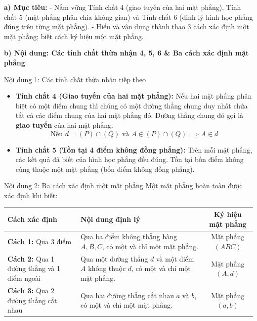\documentclass[12pt, a4paper]{article}
\begin{document}
\noindent \textbf{a) Mục tiêu:}
- Nắm vững Tính chất 4 (giao tuyến của hai mặt phẳng), Tính chất 5 (mặt phẳng phân chia không gian) và Tính chất 6 (định lý hình học phẳng đúng trên từng mặt phẳng).
- Hiểu và vận dụng thành thạo 3 cách xác định một mặt phẳng; biết cách ký hiệu một mặt phẳng.

\noindent \textbf{b) Nội dung: Các tính chất thừa nhận 4, 5, 6 \& Ba cách xác định mặt phẳng}
\begin{pedabox}{Nội dung 1: Các tính chất thừa nhận tiếp theo}
\begin{itemize}[leftmargin=0.6cm]
    \item \textbf{Tính chất 4 (Giao tuyến của hai mặt phẳng):} Nếu hai mặt phẳng phân biệt có một điểm chung thì chúng có một đường thẳng chung duy nhất chứa tất cả các điểm chung của hai mặt phẳng đó. Đường thẳng chung đó gọi là \textbf{giao tuyến} của hai mặt phẳng.
    $$\text{Nếu } d = (P) \cap (Q) \text{ và } A \in (P) \cap (Q) \implies A \in d$$
    \item \textbf{Tính chất 5 (Tồn tại 4 điểm không đồng phẳng):} Trên mỗi mặt phẳng, các kết quả đã biết của hình học phẳng đều đúng. Tồn tại bốn điểm không cùng thuộc một mặt phẳng (bốn điểm không đồng phẳng).
\end{itemize}
\end{pedabox}

\begin{pedabox}{Nội dung 2: Ba cách xác định một mặt phẳng}
Một mặt phẳng hoàn toàn được xác định khi biết:
\begin{center}
\small
\begin{tabularx}{\textwidth}{|p{3.5cm}|X|c|}
\hline
\textbf{Cách xác định} & \textbf{Nội dung định lý} & \textbf{Ký hiệu mặt phẳng} \\ \hline
\textbf{Cách 1:} Qua 3 điểm & Qua ba điểm không thẳng hàng $A, B, C$, có một và chỉ một mặt phẳng. & Mặt phẳng $(ABC)$ \\ \hline
\textbf{Cách 2:} Qua 1 đường thẳng và 1 điểm ngoài & Qua một đường thẳng $d$ và một điểm $A$ không thuộc $d$, có một và chỉ một mặt phẳng. & Mặt phẳng $(A, d)$ \\ \hline
\textbf{Cách 3:} Qua 2 đường thẳng cắt nhau & Qua hai đường thẳng cắt nhau $a$ và $b$, có một và chỉ một mặt phẳng. & Mặt phẳng $(a, b)$ \\ \hline
\end{tabularx}
\end{center}
\end{pedabox}
\end{document}
